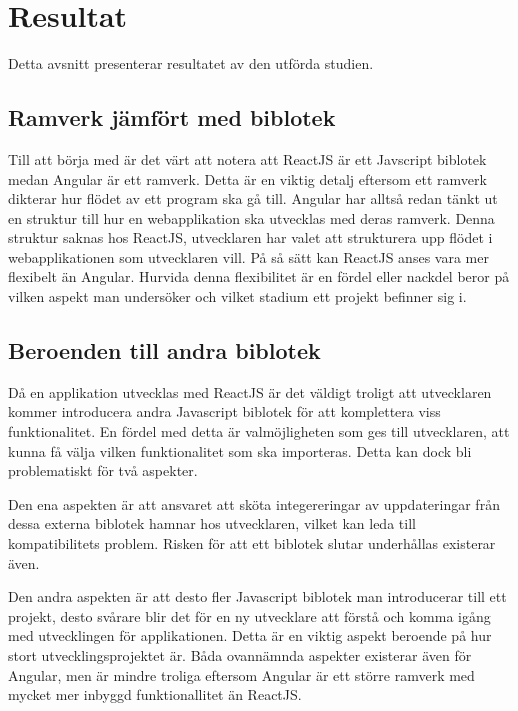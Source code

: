 \section{Resultat}
\label{sec:axel-results}
Detta avsnitt presenterar resultatet av den utförda studien.

\subsection{Ramverk jämfört med biblotek}
Till att börja med är det värt att notera att ReactJS är ett Javscript biblotek medan Angular är ett ramverk. Detta är en viktig detalj eftersom ett ramverk dikterar hur flödet av ett program ska gå till. Angular har alltså redan tänkt ut en struktur till hur en webapplikation ska utvecklas med deras ramverk. Denna struktur saknas hos ReactJS, utvecklaren har valet att strukturera upp flödet i webapplikationen som utvecklaren vill. På så sätt kan ReactJS anses vara mer flexibelt än Angular. Hurvida denna flexibilitet är en fördel eller nackdel beror på vilken aspekt man undersöker och vilket stadium ett projekt befinner sig i. 

\subsection{Beroenden till andra biblotek}
Då en applikation utvecklas med ReactJS är det väldigt troligt att utvecklaren kommer introducera andra Javascript biblotek för att komplettera viss funktionalitet. En fördel med detta är valmöjligheten som ges till utvecklaren, att kunna få välja vilken funktionalitet som ska importeras. Detta kan dock bli problematiskt för två aspekter.

Den ena aspekten är att ansvaret att sköta integereringar av uppdateringar från dessa externa biblotek hamnar hos utvecklaren, vilket kan leda till kompatibilitets problem. Risken för att ett biblotek slutar underhållas existerar även.

Den andra aspekten är att desto fler Javascript biblotek man introducerar till ett projekt, desto svårare blir det för en ny utvecklare att förstå och komma igång med utvecklingen för applikationen. Detta är en viktig aspekt beroende på hur stort utvecklingsprojektet är. Båda ovannämnda aspekter existerar även för Angular, men är mindre troliga eftersom Angular är ett större ramverk med mycket mer inbyggd funktionallitet än ReactJS.

